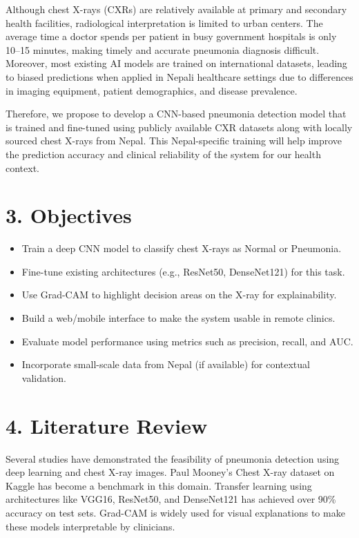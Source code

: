 \documentclass[12pt]{article}
\begin{document}
Although chest X-rays (CXRs) are relatively available at primary and secondary health facilities, radiological interpretation is limited to urban centers. The average time a doctor spends per patient in busy government hospitals is only 10–15 minutes, making timely and accurate pneumonia diagnosis difficult. Moreover, most existing AI models are trained on international datasets, leading to biased predictions when applied in Nepali healthcare settings due to differences in imaging equipment, patient demographics, and disease prevalence.

Therefore, we propose to develop a CNN-based pneumonia detection model that is trained and fine-tuned using publicly available CXR datasets along with locally sourced chest X-rays from Nepal. This Nepal-specific training will help improve the prediction accuracy and clinical reliability of the system for our health context.

\section*{3. Objectives}
\begin{itemize}
  \item Train a deep CNN model to classify chest X-rays as Normal or Pneumonia.
  \item Fine-tune existing architectures (e.g., ResNet50, DenseNet121) for this task.
  \item Use Grad-CAM to highlight decision areas on the X-ray for explainability.
  \item Build a web/mobile interface to make the system usable in remote clinics.
  \item Evaluate model performance using metrics such as precision, recall, and AUC.
  \item Incorporate small-scale data from Nepal (if available) for contextual validation.
\end{itemize}

\section*{4. Literature Review}
Several studies have demonstrated the feasibility of pneumonia detection using deep learning and chest X-ray images. Paul Mooney’s Chest X-ray dataset on Kaggle has become a benchmark in this domain. Transfer learning using architectures like VGG16, ResNet50, and DenseNet121 has achieved over 90\% accuracy on test sets. Grad-CAM is widely used for visual explanations to make these models interpretable by clinicians.
\end{document}
